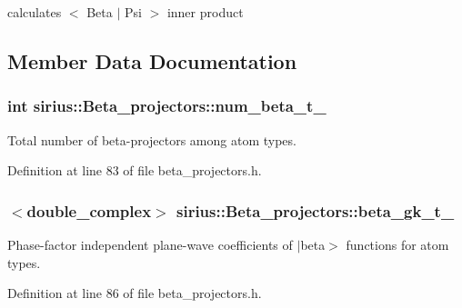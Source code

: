 calculates $<$ Beta $\vert$ Psi $>$ inner product 



\subsection{Member Data Documentation}
\hypertarget{classsirius_1_1_beta__projectors_a176c878a0f274fb8090ed0f7ec45c4e9}{}
\subsubsection[{num\+\_\+beta\+\_\+t\+\_\+}]{\setlength{\rightskip}{0pt plus 5cm}int sirius\+::\+Beta\+\_\+projectors\+::num\+\_\+beta\+\_\+t\+\_\+\hspace{0.3cm}{\ttfamily [protected]}}\label{classsirius_1_1_beta__projectors_a176c878a0f274fb8090ed0f7ec45c4e9}


Total number of beta-\/projectors among atom types. 



Definition at line 83 of file beta\+\_\+projectors.\+h.

\hypertarget{classsirius_1_1_beta__projectors_ae6909d7464080150d4bc804b23c87c82}{}
\subsubsection[{beta\+\_\+gk\+\_\+t\+\_\+}]{$<$double\+\_\+complex$>$ sirius\+::\+Beta\+\_\+projectors\+::beta\+\_\+gk\+\_\+t\+\_\+\hspace{0.3cm}{\ttfamily [protected]}}\label{classsirius_1_1_beta__projectors_ae6909d7464080150d4bc804b23c87c82}


Phase-\/factor independent plane-\/wave coefficients of $\vert$beta$>$ functions for atom types. 



Definition at line 86 of file beta\+\_\+projectors.\+h.

\hypertarget{classsirius_1_1_beta__projectors_a9503b0e8abcbc76361db077f9cd69927}{}
